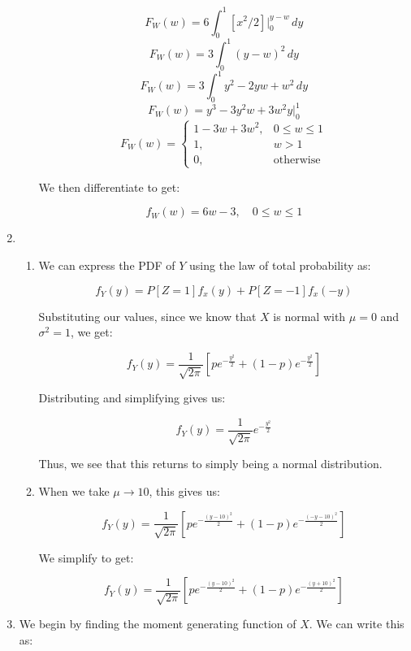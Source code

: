\begin{enumerate}
\begin{enumerate}
        $$F_W(w)=6\int_0^1[x^2/2]\Big|_0^{y-w}\,dy$$
        $$F_W(w)=3\int_0^1(y-w)^2\,dy$$
        $$F_W(w)=3\int_0^1y^2-2yw+w^2\,dy$$
        $$F_W(w)=y^3-3y^2w+3w^2y\Big|_0^1$$
        $$\boxed{F_W(w)=\left\{\begin{array}{ll} 1-3w+3w^2, & 0\leq w\leq1\\ 1, & w>1\\ 0, & \text{otherwise}\end{array}}$$

        We then differentiate to get:

        $$\boxed{f_W(w)=6w-3,\quad 0\leq w\leq 1}$$

    \end{enumerate}

  \item

    \begin{enumerate}

      \item We can express the PDF of $Y$ using the law of total probability as:

        $$f_Y(y)=P[Z=1]f_x(y)+P[Z=-1]f_x(-y)$$

        Substituting our values, since we know that $X$ is normal with $\mu=0$ and $\sigma^2=1$, we get:

        $$f_Y(y)=\frac{1}{\sqrt{2\pi}}\left[ pe^{-\frac{y^2}{2}}+(1-p)e^{-\frac{y^2}{2}} \right]$$

        Distributing and simplifying gives us:

        $$\boxed{f_Y(y)=\frac{1}{\sqrt{2\pi}}e^{-\frac{y^2}{2}}}$$

        Thus, we see that this returns to simply being a normal distribution.

      \item When we take $\mu\to 10$, this gives us:

        $$f_Y(y)=\frac{1}{\sqrt{2\pi}}\left[ pe^{-\frac{(y-10)^2}{2}}+(1-p)e^{-\frac{(-y-10)^2}{2}} \right]$$

        We simplify to get:

        $$\boxed{f_Y(y)=\frac{1}{\sqrt{2\pi}}\left[ pe^{-\frac{(y-10)^2}{2}}+(1-p)e^{-\frac{(y+10)^2}{2}} \right]}$$

    \end{enumerate}

    \setcounter{enumi}{4}

  \item We begin by finding the moment generating function of $X$. We can write this as:


\end{enumerate}

